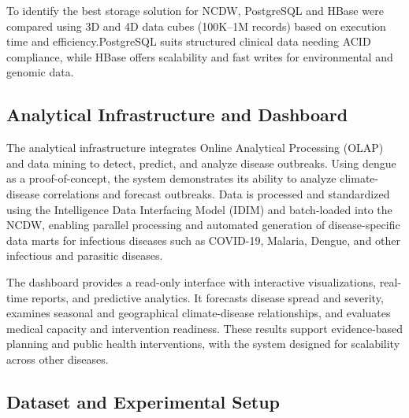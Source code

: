 To identify the best storage solution for NCDW, PostgreSQL and HBase were compared using 3D and 4D data cubes (100K–1M records) based on execution time and efficiency.PostgreSQL suits structured clinical data needing ACID compliance, while HBase offers scalability and fast writes for environmental and genomic data.


\subsection{Analytical Infrastructure and Dashboard}
\label{subsec:analytical_infrastructure}
The analytical infrastructure integrates Online Analytical Processing (OLAP) and data mining to detect, predict, and analyze disease outbreaks. Using dengue as a proof-of-concept, the system demonstrates its ability to analyze climate-disease correlations and forecast outbreaks. Data is processed and standardized using the Intelligence Data Interfacing Model (IDIM) and batch-loaded into the NCDW, enabling parallel processing and automated generation of disease-specific data marts for infectious diseases such as COVID-19, Malaria, Dengue, and other infectious and parasitic diseases.

The dashboard provides a read-only interface with interactive visualizations, real-time reports, and predictive analytics. It forecasts disease spread and severity, examines seasonal and geographical climate-disease relationships, and evaluates medical capacity and intervention readiness. These results support evidence-based planning and public health interventions, with the system designed for scalability across other diseases. 



\vspace{-5mm}
\subsection{Dataset and Experimental Setup}
\label{subsec:dataset_description}

